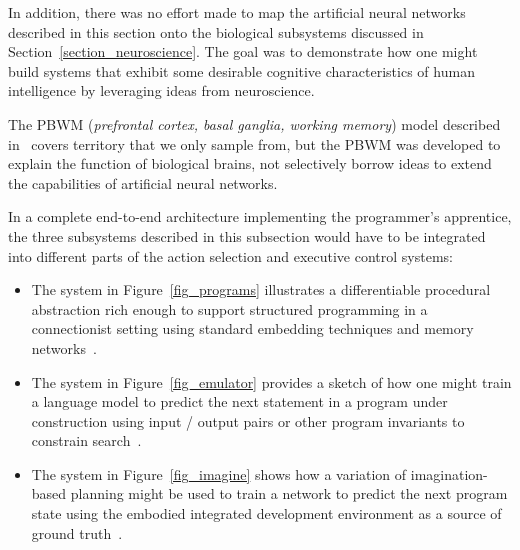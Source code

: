 \documentclass[letterpaper,11pt]{article}
\def\urlh#1{{}}
\begin{document}
In addition, there was no effort made to map the artificial neural networks described in this section onto the biological subsystems discussed in Section~\ref{section_neuroscience}. The goal was to demonstrate how one might build systems that exhibit some desirable cognitive characteristics of human intelligence by leveraging ideas from neuroscience.

The PBWM ({\it{prefrontal cortex, basal ganglia, working memory}}) model described in~\cite{OReillyandFrankNC-06,HazyetalPTRS-07} covers territory that we only sample from, but the PBWM was developed to explain the function of biological brains, not selectively borrow ideas to extend the capabilities of artificial neural networks.

In a complete end-to-end architecture implementing the programmer's apprentice, the three subsystems described in this subsection would have to be integrated into different parts of the action selection and executive control systems: 
%
\begin{itemize}
%
\item The system in Figure~{\urlh{#fig_Differentiable_Structured_Programs}{\ref{fig_programs}}} illustrates a differentiable procedural abstraction rich enough to support structured programming in a connectionist setting using standard embedding techniques and memory networks~\cite{WestonetalCoRR-14,DanihelkaetalCoRR-16,GravesetalCoRR-14,GravesetalNATURE-16}.
%
\item The system in Figure~{\urlh{#fig_Differentiable_Program_Emulation}{\ref{fig_emulator}}} provides a sketch of how one might train a language model to predict the next statement in a program under construction using input / output pairs or other program invariants to constrain search~\cite{WangetalCoRR-18,WangetalCoRR-17,SinghandKohliSNAPL-17,DevlinetalICML-17}.
%
\item The system in Figure~{\urlh{#Graph_Nets_Imagination_Coding}{\ref{fig_imagine}}} shows how a variation of imagination-based planning might be used to train a network to predict the next program state using the embodied integrated development environment as a source of ground truth~\cite{WeberetalCoRR-17,PascanuetalCoRR-17,HamricketalCoRR-17}.
%
\end{itemize}
\end{document}
